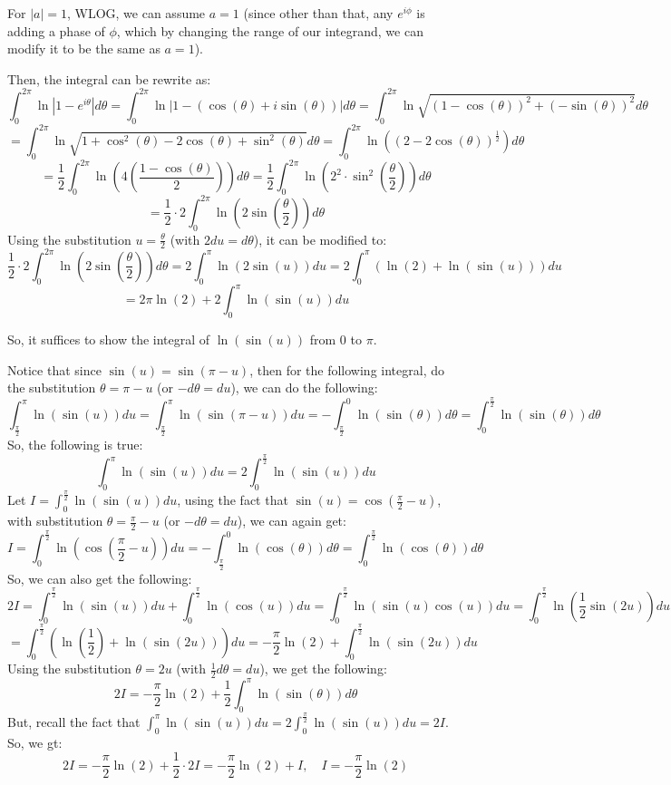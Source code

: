 \documentclass{article}
\begin{document}
For $|a|=1$, WLOG, we can assume $a=1$ (since other than that, any $e^{i\phi}$ is adding a phase of $\phi$, which by changing the range of our integrand, we can modify it to be the same as $a=1$).

Then, the integral can be rewrite as:
$$\int_{0}^{2\pi}\ln|1-e^{i\theta}|d\theta = \int_{0}^{2\pi}\ln|1-(\cos(\theta)+i\sin(\theta))|d\theta = \int_{0}^{2\pi}\ln\sqrt{(1-\cos(\theta))^2+(-\sin(\theta))^2}d\theta$$
$$=\int_{0}^{2\pi}\ln\sqrt{1+\cos^2(\theta)-2\cos(\theta)+\sin^2(\theta)}d\theta = \int_{0}^{2\pi}\ln\left((2-2\cos(\theta))^\frac{1}{2}\right)d\theta$$
$$=\frac{1}{2}\int_{0}^{2\pi}\ln\left(4\left(\frac{1-\cos(\theta)}{2}\right)\right)d\theta = \frac{1}{2}\int_{0}^{2\pi}\ln\left(2^2\cdot \sin^2\left(\frac{\theta}{2}\right)\right)d\theta$$
$$ = \frac{1}{2}\cdot 2\int_{0}^{2\pi}\ln\left(2\sin\left(\frac{\theta}{2}\right)\right)d\theta$$
Using the substitution $u=\frac{\theta}{2}$ (with $2du = d\theta$), it can be modified to:
$$\frac{1}{2}\cdot 2\int_{0}^{2\pi}\ln\left(2\sin\left(\frac{\theta}{2}\right)\right)d\theta = 2\int_{0}^{\pi}\ln(2\sin(u))du = 2\int_{0}^{\pi}(\ln(2)+\ln(\sin(u)))du$$
$$ = 2\pi\ln(2) + 2\int_{0}^{\pi}\ln(\sin(u))du$$

So, it suffices to show the integral of $\ln(\sin(u))$ from $0$ to $\pi$.

\hfil

Notice that since $\sin(u)=\sin(\pi-u)$, then for the following integral, do the substitution $\theta=\pi-u$ (or $-d\theta = du$), we can do the following:
$$\int_{\frac{\pi}{2}}^{\pi}\ln(\sin(u))du = \int_{\frac{\pi}{2}}^{\pi}\ln(\sin(\pi-u))du = -\int_{\frac{\pi}{2}}^{0}\ln(\sin(\theta))d\theta = \int_{0}^{\frac{\pi}{2}}\ln(\sin(\theta))d\theta$$
So, the following is true:
$$\int_{0}^{\pi}\ln(\sin(u))du = 2\int_{0}^{\frac{\pi}{2}}\ln(\sin(u))du$$
Let $I=\int_{0}^{\frac{\pi}{2}}\ln(\sin(u))du$, using the fact that $\sin(u)=\cos(\frac{\pi}{2}-u)$, with substitution $\theta=\frac{\pi}{2}-u$ (or $-d\theta=du$), we can again get:
$$I=\int_{0}^{\frac{\pi}{2}}\ln\left(\cos\left(\frac{\pi}{2}-u\right)\right)du = -\int_{\frac{\pi}{2}}^{0}\ln(\cos(\theta))d\theta = \int_{0}^{\frac{\pi}{2}}\ln(\cos(\theta))d\theta$$
So, we can also get the following:
$$2I=\int_{0}^{\frac{\pi}{2}}\ln(\sin(u))du+\int_{0}^{\frac{\pi}{2}}\ln(\cos(u))du = \int_{0}^{\frac{\pi}{2}}\ln(\sin(u)\cos(u))du = \int_{0}^{\frac{\pi}{2}}\ln\left(\frac{1}{2}\sin(2u)\right)du$$
$$=\int_{0}^{\frac{\pi}{2}}\left(\ln\left(\frac{1}{2}\right)+\ln(\sin(2u))\right)du = -\frac{\pi}{2}\ln(2) + \int_{0}^{\frac{\pi}{2}}\ln(\sin(2u))du$$
Using the substitution $\theta=2u$ (with $\frac{1}{2}d\theta=du$), we get the following:
$$2I = -\frac{\pi}{2}\ln(2)+\frac{1}{2}\int_{0}^{\pi}\ln(\sin(\theta))d\theta$$
But, recall the fact that $\int_{0}^{\pi}\ln(\sin(u))du = 2\int_{0}^{\frac{\pi}{2}}\ln(\sin(u))du = 2I$. So, we gt:
$$2I=-\frac{\pi}{2}\ln(2)+\frac{1}{2}\cdot 2I = -\frac{\pi}{2}\ln(2)+I,\quad I=-\frac{\pi}{2}\ln(2)$$
\end{document}
